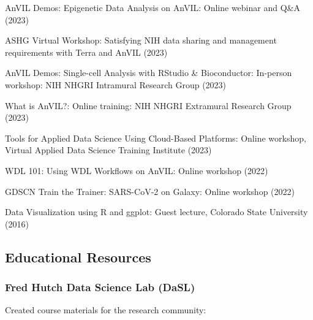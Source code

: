 \documentclass{cv}
\begin{document}
AnVIL Demos: Epigenetic Data Analysis on AnVIL: Online webinar and Q\&A (2023)

ASHG Virtual Workshop: Satisfying NIH data sharing and management requirements with Terra and AnVIL (2023)

AnVIL Demos: Single-cell Analysis with RStudio \& Bioconductor: In-person workshop: NIH NHGRI Intramural Research Group (2023)

What is AnVIL?: Online training: NIH NHGRI Extramural Research Group (2023)

Tools for Applied Data Science Using Cloud-Based Platforms: Online workshop, Virtual Applied Data Science Training Institute (2023)

WDL 101: Using WDL Workflows on AnVIL: Online workshop (2022)

GDSCN Train the Trainer: SARS-CoV-2 on Galaxy: Online workshop (2022)

Data Visualization using R and ggplot: Guest lecture, Colorado State University (2016)

\subsection*{Educational Resources}

\subsubsection*{Fred Hutch Data Science Lab (DaSL)}

Created course materials for the research community: 
\end{document}
